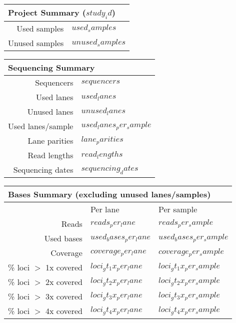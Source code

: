 \documentclass[10pt]{article}
\begin{document}
    \rhead{}
    \chead{}

    \begin{multicols}{2}
        \begin{tabular}{|r|l|}
            \multicolumn{2}{l}{\bfseries{Project Summary ($study_id$)}} \\
            \hline
            Used samples & $used_samples$  \\
            Unused samples & $unused_samples$ \\
            \hline
        \end{tabular}

        \begin{tabular}{|r|l|}
            \multicolumn{2}{l}{\bfseries{Sequencing Summary}} \\
            \hline
            Sequencers & $sequencers$ \\
            Used lanes & $used_lanes$ \\
            Unused lanes & $unused_lanes$ \\
            Used lanes/sample & $used_lanes_per_sample$ \\
            Lane parities & $lane_parities$ \\
            Read lengths & $read_lengths$ \\
            Sequencing dates & $sequencing_dates$ \\
            \hline
        \end{tabular}

        \begin{tabular}{|r|l|l|}
            \multicolumn{3}{l}{\bfseries{Bases Summary (excluding unused lanes/samples)}} \\
            \hline
            & Per lane & Per sample \\
            \hline
            Reads & $reads_per_lane$ & $reads_per_sample$ \\
            Used bases & $used_bases_per_lane$ & $used_bases_per_sample$ \\
            Coverage & $coverage_per_lane$ & $coverage_per_sample$ \\
            \% loci $>$ 1x covered & $loci_gt_1x_per_lane$ & $loci_gt_1x_per_sample$ \\
            \% loci $>$ 2x covered & $loci_gt_2x_per_lane$ & $loci_gt_2x_per_sample$ \\
            \% loci $>$ 3x covered & $loci_gt_3x_per_lane$ & $loci_gt_3x_per_sample$ \\
            \% loci $>$ 4x covered & $loci_gt_4x_per_lane$ & $loci_gt_4x_per_sample$ \\
            \hline
        \end{tabular}


\end{multicols}
\end{document}
